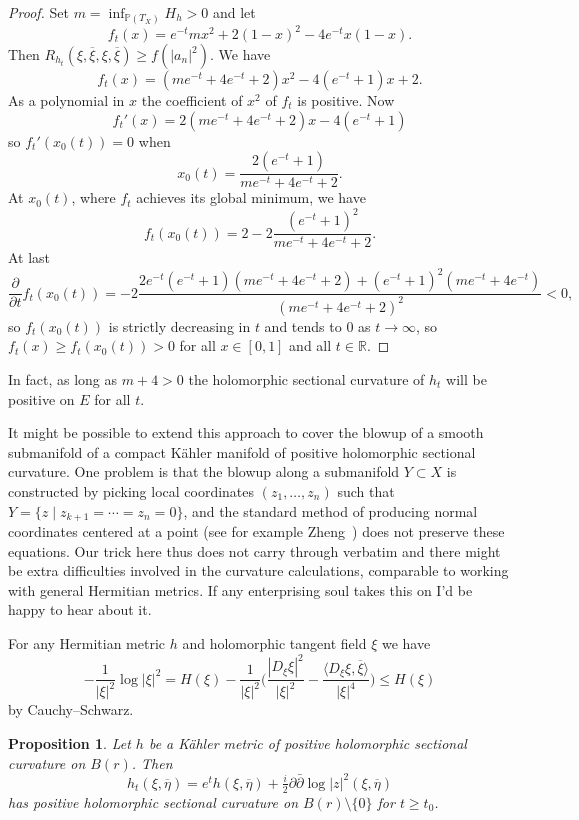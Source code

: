 \documentclass[10pt,a4paper]{amsart}
\newtheorem{prop}[theo]{Proposition}
\newcommand{\kk}[1]{\mathbb{#1}}
\def\<{\langle}
\def\>{\rangle}
\def\ov#1{\overline{#1}}
\def\hsc{holomorphic sectional curvature}
\begin{document}
\begin{proof}
Set $m = \inf_{\kk P(T_X)} H_h > 0$ and let
$$
f_t(x) = e^{-t} m x^2 + 2(1-x)^2 - 4e^{-t} x(1-x).
$$
Then $R_{h_t}(\xi, \ov\xi, \xi, \ov\xi) \geq f(|a_n|^2)$.
We have
$$
f_t(x)
= (m e^{-t} + 4e^{-t} + 2)x^2 - 4(e^{-t} + 1)x + 2.
$$
As a polynomial in $x$ the coefficient of $x^2$ of $f_t$ is positive.
Now
$$
f_t'(x)
= 2(m e^{-t} + 4e^{-t} + 2)x - 4(e^{-t} + 1)
$$
so $f_t'(x_0(t)) = 0$ when
$$
x_0(t) = \frac{2(e^{-t} + 1)}{m e^{-t} + 4e^{-t} + 2}.
$$
At $x_0(t)$, where $f_t$ achieves its global minimum, we have
$$
f_t(x_0(t))
=
2 - 2 \frac{(e^{-t} + 1)^2}{m e^{-t} + 4e^{-t} + 2}.
$$
At last
$$
\frac{\partial}{\partial t} f_t(x_0(t))
= -2 \frac{2e^{-t}(e^{-t}+1)(m e^{-t} + 4e^{-t} + 2) + (e^{-t}+1)^2(me^{-t}+4e^{-t})}{(m e^{-t} + 4e^{-t} + 2)^2}
< 0,
$$
so $f_t(x_0(t))$ is strictly decreasing in $t$ and tends to $0$ as $t \to
\infty$, so $f_t(x) \geq f_t(x_0(t)) > 0$ for all $x \in [0,1]$ and all $t \in
\kk R$.
\end{proof}

In fact, as long as $m + 4 > 0$ the \hsc{} of $h_t$ will be positive on $E$ for
all $t$.



It might be possible to extend this approach to cover the blowup of a smooth
submanifold of a compact K\"ahler manifold of positive \hsc.
One problem
is that the blowup along a submanifold $Y \subset X$ is
constructed by picking local coordinates $(z_1,\ldots,z_n)$ such that $Y = \{z
\mid z_{k+1} = \cdots = z_n = 0\}$,
and the standard method of producing normal coordinates centered at a point
(see for example Zheng~\cite{zheng2000complex})
does not preserve these equations.
Our trick here thus does not carry through verbatim and there might be extra
difficulties involved in the curvature calculations, comparable to working
with general Hermitian metrics.
If any enterprising soul takes this on I'd be happy to hear about it.


For any Hermitian metric $h$ and holomorphic tangent field $\xi$ we have
$$
- \frac{1}{|\xi|^2} \log |\xi|^2
= H(\xi)
- \frac{1}{|\xi|^2} \biggl(
\frac{|D_\xi \xi|^2}{|\xi|^2}
- \frac{\<D_\xi \xi, \ov \xi\>}{|\xi|^4}
\biggr)
\leq H(\xi)
$$
by Cauchy--Schwarz.


\begin{prop}
Let $h$ be a K\"ahler metric of positive \hsc{} on $B(r)$.
Then
$$
h_t(\xi, \ov\eta)
= e^t h(\xi, \ov\eta) + \tfrac i2 \partial \bar\partial \log |z|^2(\xi, \ov\eta)
$$
has positive \hsc{} on $B(r) \setminus\{0\}$ for $t \geq t_0$.
\end{prop}
\end{document}
